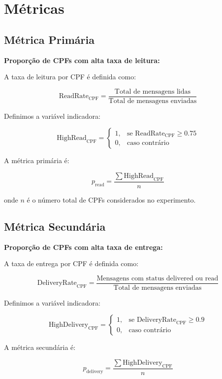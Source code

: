 \section{Métricas}

\subsection{Métrica Primária}

\textbf{Proporção de CPFs com alta taxa de leitura:}

A taxa de leitura por CPF é definida como:

\[
\text{ReadRate}_{\text{CPF}} = \frac{\text{Total de mensagens lidas}}{\text{Total de mensagens enviadas}}
\]

Definimos a variável indicadora:

\[
\text{HighRead}_{\text{CPF}} =
\begin{cases}
1, & \text{se } \text{ReadRate}_{\text{CPF}} \geq 0.75 \\
0, & \text{caso contrário}
\end{cases}
\]

A métrica primária é:

\[
p_{\text{read}} = \frac{\sum \text{HighRead}_{\text{CPF}}}{n}
\]

onde $n$ é o número total de CPFs considerados no experimento.

\vspace{0.3cm}

\subsection{Métrica Secundária}

\textbf{Proporção de CPFs com alta taxa de entrega:}

A taxa de entrega por CPF é definida como:

\[
\text{DeliveryRate}_{\text{CPF}} = \frac{\text{Mensagens com status delivered ou read}}{\text{Total de mensagens enviadas}}
\]

Definimos a variável indicadora:

\[
\text{HighDelivery}_{\text{CPF}} =
\begin{cases}
1, & \text{se } \text{DeliveryRate}_{\text{CPF}} \geq 0.9 \\
0, & \text{caso contrário}
\end{cases}
\]

A métrica secundária é:

\[
p_{\text{delivery}} = \frac{\sum \text{HighDelivery}_{\text{CPF}}}{n}
\]

